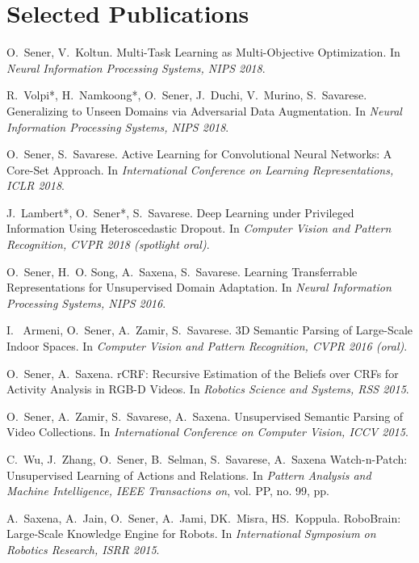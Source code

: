 
\section{\mysidestyle \textcolor{olgray}{Selected Publications}}

O.~Sener, V.~Koltun.
\newblock Multi-Task Learning as Multi-Objective Optimization. 
\newblock In {\em Neural Information Processing Systems, NIPS 2018}.
\vspace{-2mm}

R.~Volpi*, H.~Namkoong*, O.~Sener, J.~Duchi, V.~Murino, S.~Savarese.
\newblock Generalizing to Unseen Domains via Adversarial Data Augmentation. 
\newblock In {\em Neural Information Processing Systems, NIPS 2018}.
\vspace{-2mm}

O.~Sener, S.~Savarese.
\newblock Active Learning for Convolutional Neural Networks: A Core-Set Approach.
\newblock In {\em International Conference on Learning Representations, ICLR 2018}.
\vspace{-2mm}

J.~Lambert*, O.~Sener*, S.~Savarese.
\newblock Deep Learning under Privileged Information Using Heteroscedastic Dropout. 
\newblock In {\em Computer Vision and Pattern Recognition, CVPR 2018 (spotlight oral)}.
\vspace{-2mm}

O.~Sener, H.~O. Song, A.~Saxena, S.~Savarese.
\newblock Learning Transferrable Representations for Unsupervised Domain Adaptation. 
\newblock In {\em Neural Information Processing Systems, NIPS 2016}.
\vspace{-2mm}

I. ~Armeni, O.~Sener, A.~Zamir, S.~Savarese.
\newblock 3D Semantic Parsing of Large-Scale Indoor Spaces.
\newblock In {\em Computer Vision and Pattern Recognition, CVPR 2016 (oral)}.
\vspace{-2mm}

\newpage

O.~Sener, A.~Saxena.
\newblock rCRF: Recursive Estimation of the Beliefs over CRFs for Activity Analysis in RGB-D Videos.
\newblock In {\em Robotics Science and Systems, RSS 2015}.
\vspace{-2mm}

O.~Sener, A.~Zamir, S.~Savarese, A.~Saxena.
\newblock Unsupervised Semantic Parsing of Video Collections.
\newblock In {\em International Conference on Computer Vision, ICCV 2015}.
\vspace{-2mm}


C.~Wu, J.~Zhang, O.~Sener, B.~Selman, S.~Savarese, A.~Saxena
\newblock Watch-n-Patch: Unsupervised Learning of Actions and Relations.
\newblock In {\em Pattern Analysis and Machine Intelligence, IEEE Transactions on}, vol. PP, no. 99, pp.


A.~Saxena, A.~Jain, O.~Sener, A.~Jami, DK.~Misra, HS.~Koppula.
\newblock RoboBrain: Large-Scale Knowledge Engine for Robots.
\newblock In {\em International Symposium on Robotics Research, ISRR 2015}.
\vspace{-2mm}
